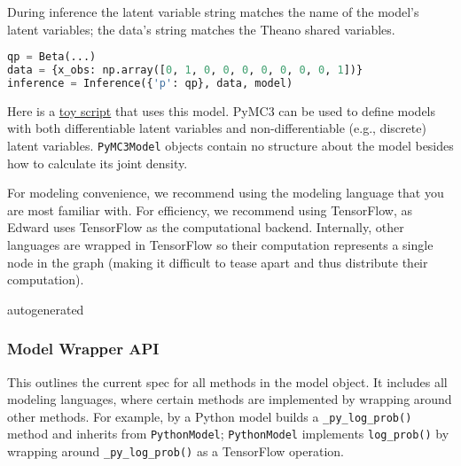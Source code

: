 During inference the latent variable string matches the name of the
model's latent variables; the data's string matches the Theano shared
variables.

\begin{lstlisting}[language=Python]
qp = Beta(...)
data = {x_obs: np.array([0, 1, 0, 0, 0, 0, 0, 0, 0, 1])}
inference = Inference({'p': qp}, data, model)
\end{lstlisting}

Here is a
\href{https://github.com/blei-lab/edward/blob/master/examples/pymc3_beta_bernoulli.py}
{toy script}
that uses this model. PyMC3 can be used to define models with both
differentiable latent variables and non-differentiable (e.g., discrete)
latent variables. \texttt{PyMC3Model} objects contain no structure about the
model besides how to calculate its joint density.

For modeling convenience, we recommend using the modeling language that
you are most familiar with. For efficiency, we recommend using
TensorFlow, as Edward uses TensorFlow as the computational backend.
Internally, other languages are wrapped in TensorFlow so their
computation represents a single node in the graph (making it difficult
to tease apart and thus distribute their computation).

{{autogenerated}}

\subsubsection{Model Wrapper API}

This outlines the current spec for all methods in the model object.
It includes all modeling languages, where certain methods are
implemented by wrapping around other methods. For example, by a Python
model builds a \texttt{_py_log_prob()} method and inherits from
\texttt{PythonModel}; \texttt{PythonModel} implements \texttt{log_prob()} by wrapping
around \texttt{_py_log_prob()} as a TensorFlow operation.


